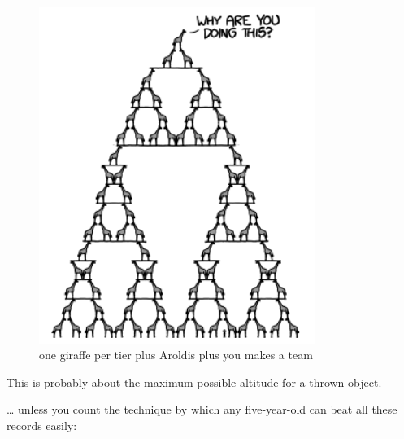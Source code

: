 {\begin{figure}[!htbp]
\centering
\includegraphics[scale=0.5, max width=0.8\textwidth]{imgs/a/44/high_throw_16.png}
\caption{one giraffe per tier plus Aroldis plus you makes a team}
\end{figure}

{This is probably about the maximum possible altitude for a thrown object.}

{… unless you count the technique by which any five-year-old can beat all these records easily:}

}
